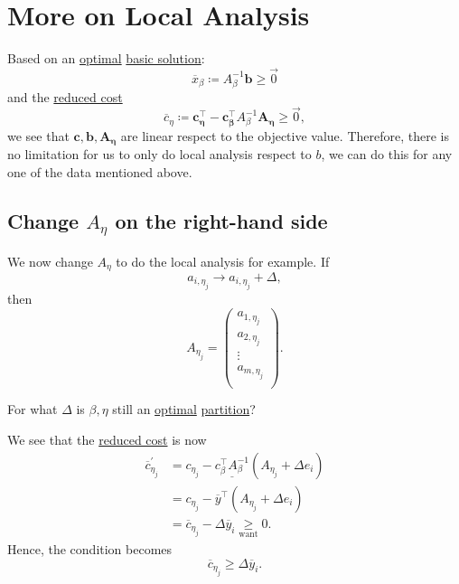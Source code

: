 \section{More on Local Analysis}
\begin{prev}
	Based on an \hyperref[def:optimal-solution]{optimal} \hyperref[def:basic-solution]{basic solution}:
	\[
		\overline{x}_{\beta} \coloneqq A^{-1}_{\beta}\bm{b}\geq \vec{0}
	\]
	and the \hyperref[def:reduced-cost]{reduced cost}
	\[
		\overline{c}_{\eta}\coloneqq \bm{c_{\eta}^{\top}} - \bm{c^{\top}_{\beta}}A^{-1}_{\beta}\bm{A_{\eta}} \geq \vec{0},
	\]
	we see that \(\bm{c}, \bm{b}, \bm{A_{\eta}}\) are linear respect to the objective value. Therefore, there is no limitation for us to only do local analysis
	respect to \(b\), we can do this for any one of the data mentioned above.
\end{prev}

\subsection{Change \(A_{\eta}\) on the right-hand side}
We now change \(A_{\eta}\) to do the local analysis for example. If
\[
	a_{i, \eta_j} \to a_{i, \eta_{j}}+\Delta,
\]
then
\[
	A_{\eta_j} = \begin{pmatrix}
		a_{1, \eta_{j}} \\
		a_{2, \eta_{j}} \\
		\vdots          \\
		a_{m, \eta_{j}} \\
	\end{pmatrix}.
\]
\begin{problem}
For what \(\Delta\) is \(\beta, \eta\) still an \hyperref[def:optimal-solution]{optimal} \hyperref[def:basic-partition]{partition}?
\end{problem}
\begin{answer}
	We see that the \hyperref[def:reduced-cost]{reduced cost} is now
	\[
		\begin{split}
			\overline{c}_{\eta_{j}}^\prime &= c_{\eta_{j}} - \underline{c_{\beta}^{\top}A^{-1}_{\beta}}\left( A_{\eta_{j}} +\Delta e_{i}\right) \\
			&= c_{\eta_{j}} - \overline{y}^{\top}(A_{\eta_{j}}+\Delta e_{i})\\
			&= \overline{c}_{\eta_{j}} - \Delta \overline{y}_i\underset{\text{want}}{\geq} 0.
		\end{split}
	\]
	Hence, the condition becomes
	\[
		\overline{c}_{\eta_{j}} \geq \Delta \overline{y}_i.
	\]
\end{answer}

